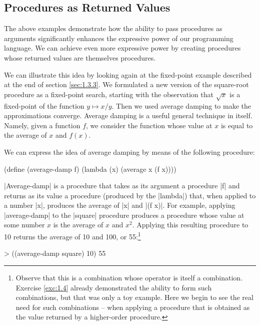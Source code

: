 \subsection{Procedures as Returned Values}
\label{sec:1.3.4}



The above examples demonstrate how the ability to pass procedures as
arguments significantly enhances the expressive power of our
programming language.  We can achieve even more expressive power by
creating procedures whose returned values are themselves procedures.

We can illustrate this idea by looking again at the fixed-point
example described at the end of section \ref{sec:1.3.3}.  We
formulated a new version of the square-root procedure as a fixed-point
search, starting with the observation that $\sqrt x$ is a fixed-point
of the function $y \mapsto x/y$.  Then we used average damping to make
the approximations converge.  Average damping is a useful general
technique in itself.  Namely, given a function $f$, we consider the
function whose value at $x$ is equal to the average of $x$ and $f(x)$.


We can express the idea of average damping by means of the
following procedure:

\begin{schemedisplay}
(define (average-damp f)
  (lambda (x) (average x (f x))))
\end{schemedisplay}
\scheme|Average-damp| is a procedure that takes as its argument a
procedure \scheme|f| and returns as its value a procedure (produced by
the \scheme|lambda|) that, when applied to a number \scheme|x|,
produces the average of \scheme|x| and \scheme|(f x)|.  For example,
applying \scheme|average-damp| to the \scheme|square| procedure
produces a procedure whose value at some number $x$ is the average of
$x$ and $x^2$.  Applying this resulting procedure to 10 returns the
average of 10 and 100, or 55:\footnote{Observe that this is a
  combination whose operator is itself a combination.  Exercise
  \ref{exc:1.4} already demonstrated the ability to form such
  combinations, but that was only a toy example.  Here we begin to see
  the real need for such combinations -- when applying a procedure
  that is obtained as the value returned by a higher-order procedure.}

\begin{schemedisplay}
> ((average-damp square) 10)
55
\end{schemedisplay}

